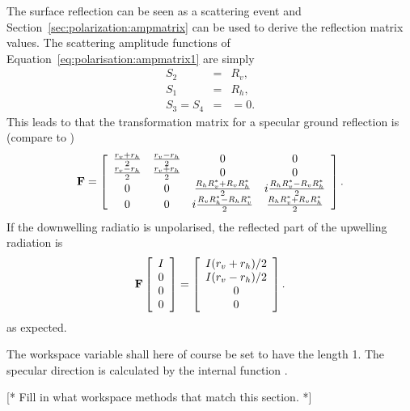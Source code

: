  The surface reflection can be seen as a scattering event and
 Section~\ref{sec:polarization:ampmatrix} can be used to derive the
 reflection matrix values. The scattering amplitude functions of
 Equation~\ref{eq:polarisation:ampmatrix1} are simply
 \begin{eqnarray}
   S_2 &=& R_v, \\
   S_1 &=& R_h, \\
   S_3 = S_4 &=& =0.
 \end{eqnarray}
 This leads to that the transformation matrix for a specular ground
 reflection is (compare to \citet[Sec.\ 5.4.3]{liou:02})
 \begin{equation}
   \label{eq:rte:specular_matrix}
   \mathbf{F} =
      \left[\begin{array}{cccc}
        \frac{r_v+r_h}{2}&\frac{r_v-r_h}{2}&0&0\\
        \frac{r_v-r_h}{2}&\frac{r_v+r_h}{2}&0&0\\
     0&0&\frac{R_hR_v^\ast+R_vR_h^\ast}{2}&i\frac{R_hR_v^\ast-R_vR_h^\ast}{2}\\
     0&0&i\frac{R_vR_h^\ast-R_hR_v^\ast}{2}&\frac{R_hR_v^\ast+R_vR_h^\ast}{2}\\
      \end{array}
      \right].
 \end{equation}
 If the downwelling radiatio is unpolarised, the reflected part of the
 upwelling radiation is
 \begin{equation}
   \mathbf{F}
   \left[ \begin{array}{c} I\\0\\0\\0 \end{array} \right] =
   \left[ \begin{array}{c} I(r_v+r_h)/2\\I(r_v-r_h)/2\\0\\0 
   \end{array} \right].
 \end{equation}
 as expected.

 The workspace variable  shall here
 of course be set to have the length 1. The specular direction is
 calculated by the internal function .

 [* Fill in what workspace methods that match this section. *]


 \label{sec:rte:surface:emission}
 
